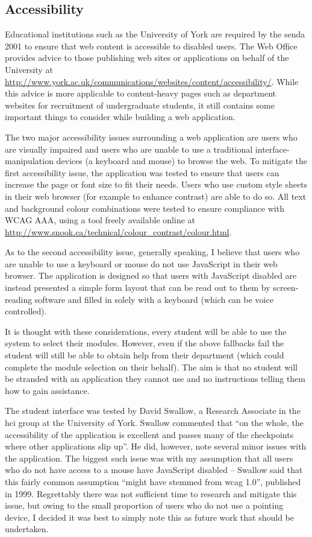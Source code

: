 
\subsection{Accessibility}

Educational institutions such as the University of York are required by the
\gls{senda} 2001 to ensure that web content is accessible to disabled users.
The Web Office provides advice to those publishing web sites or applications
on behalf of the University at
\url{http://www.york.ac.uk/communications/websites/content/accessibility/}.
While this advice is more applicable to content-heavy pages such as department
websites for recruitment of undergraduate students, it still contains some
important things to consider while building a web application.

The two major accessibility issues surrounding a web application are users who
are visually impaired and users who are unable to use a traditional
interface-manipulation devices (a keyboard and mouse) to browse the web. To
mitigate the first accessibility issue, the application was tested to ensure
that users can increase the page or font size to fit their needs. Users who
use custom style sheets in their web browser (for example to enhance contrast)
are able to do so. All text and background colour combinations were tested to
ensure compliance with WCAG AAA, using a tool freely available online at
\url{http://www.snook.ca/technical/colour_contrast/colour.html}.

As to the second accessibility issue, generally speaking, I believe that users
who are unable to use a keyboard or mouse do not use JavaScript in their web
browser. The application is designed so that users with JavaScript disabled
are instead presented a simple form layout that can be read out to them by
screen-reading software and filled in solely with a keyboard (which can be
voice controlled).

It is thought with these considerations, every student will be able to use the
system to select their modules. However, even if the above fallbacks fail the
student will still be able to obtain help from their department (which could
complete the module selection on their behalf). The aim is that no student
will be stranded with an application they cannot use and no instructions
telling them how to gain assistance.

The student interface was tested by David Swallow, a Research Associate in the
\gls{hci} group at the University of York. Swallow commented that ``on the
whole, the accessibility of the application is excellent and passes many of
the checkpoints where other applications slip up''. He did, however, note
several minor issues with the application. The biggest such issue was with my
assumption that all users who do not have access to a mouse have JavaScript
disabled -- Swallow said that this fairly common assumption ``might have
stemmed from \gls{wcag} 1.0'', published in 1999. Regrettably there was not
sufficient time to research and mitigate this issue, but owing to the small
proportion of users who do not use a pointing device, I decided it was best to
simply note this as future work that should be undertaken.
